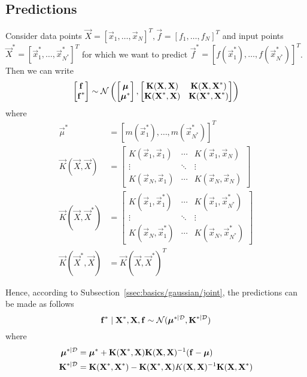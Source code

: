 \subsection{Predictions}
Consider data points $\vec X = [\vec x_1, \dotsc, \vec x_N]^T, \vec f = [f_1, \dotsc, f_N]^T$ and input points $\vec X^\ast = [\vec x_1^\ast, \dotsc, \vec x_{N^\ast}^\ast]^T$ for which we want to predict $\vec f^\ast = [f(\vec x_1^\ast), \dotsc, f(\vec x_{N^\ast}^\ast)]^T$. Then we can write
\begin{equation*}
	\begin{bmatrix}
		\boldsymbol{\mathbf{f}} \\
		\boldsymbol{\mathbf{f}}^\ast
	\end{bmatrix}
	\sim
	\operatorname{\mathcal N}\left(
		\begin{bmatrix}
			\boldsymbol{\mathbf{\mu}} \\
			\boldsymbol{\mathbf{\mu}}^\ast
		\end{bmatrix},
		\begin{bmatrix}
			\boldsymbol{\mathbf{K}}(\boldsymbol{\mathbf{X}}, \boldsymbol{\mathbf{X}}) 			& \boldsymbol{\mathbf{K}}(\boldsymbol{\mathbf{X}}, \boldsymbol{\mathbf{X}}^\ast) \\
			\boldsymbol{\mathbf{K}}(\boldsymbol{\mathbf{X}}^\ast, \boldsymbol{\mathbf{X}}) 	& \boldsymbol{\mathbf{K}}(\boldsymbol{\mathbf{X}}^\ast, \boldsymbol{\mathbf{X}}^\ast)
		\end{bmatrix}
	\right)
\end{equation*}
where
\begin{align*}
	\vec \mu^\ast 					&= [m(\vec x_1^\ast), \dotsc, m(\vec x_{N^\ast}^\ast)]^T \\
	\vec K(\vec X, \vec X) 			&=
		\begin{bmatrix}
			K(\vec x_1, \vec x_1) 	& \cdots & K(\vec x_1, \vec x_N) \\
			\vdots 					& \ddots & \vdots \\
			K(\vec x_N, \vec x_1) 	& \cdots & K(\vec x_N, \vec x_N)
		\end{bmatrix} \\
	\vec K(\vec X, \vec X^\ast) 	&=
		\begin{bmatrix}
			K(\vec x_1, \vec x_1^\ast) 	& \cdots & K(\vec x_1, \vec x_{N^\ast}^\ast) \\
			\vdots 						& \ddots & \vdots \\
			K(\vec x_N, \vec x_1^\ast) 	& \cdots & K(\vec x_N, \vec x_{N^\ast}^\ast)
		\end{bmatrix} \\
	\vec K(\vec X^\ast, \vec X) 	&= \vec K(\vec X, \vec X^\ast)^T
\end{align*}

Hence, according to Subsection~\ref{ssec:basics/gaussian/joint}, the predictions can be made as follows
\begin{equation*}
	\boldsymbol{\mathbf{f}}^\ast \mid \boldsymbol{\mathbf{X}}^\ast, \boldsymbol{\mathbf{X}}, \boldsymbol{\mathbf{f}} \sim \operatorname{\mathcal N}(\boldsymbol{\mathbf{\mu}}^{\ast \mid \mathcal D}, \boldsymbol{\mathbf{K}}^{\ast \mid \mathcal D})
\end{equation*}
where
\begin{align*}
	\boldsymbol{\mathbf{\mu}}^{\ast \mid \mathcal D} 	&= \boldsymbol{\mathbf{\mu}}^\ast + \boldsymbol{\mathbf{K}}(\boldsymbol{\mathbf{X}}^\ast, \boldsymbol{\mathbf{X}}) \boldsymbol{\mathbf{K}}(\boldsymbol{\mathbf{X}}, \boldsymbol{\mathbf{X}})^{-1} (\boldsymbol{\mathbf{f}} - \boldsymbol{\mathbf{\mu}}) \\
	\boldsymbol{\mathbf{K}}^{\ast \mid \mathcal D}		&= \boldsymbol{\mathbf{K}}(\boldsymbol{\mathbf{X}}^\ast, \boldsymbol{\mathbf{X}}^\ast) - \boldsymbol{\mathbf{K}}(\boldsymbol{\mathbf{X}}^\ast, \boldsymbol{\mathbf{X}}) K(\boldsymbol{\mathbf{X}}, \boldsymbol{\mathbf{X}})^{-1} \boldsymbol{\mathbf{K}}(\boldsymbol{\mathbf{X}}, \boldsymbol{\mathbf{X}}^\ast)
\end{align*}